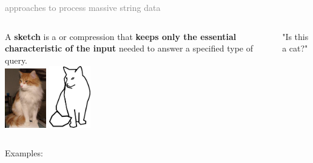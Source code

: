 \begin{frame}{\textcolor{gray}{ approaches to process massive string data}}
    \pause
    \begin{columns}
        A \textbf{sketch} is a  or  compression that \textbf{keeps only the essential characteristic of the input} needed to answer a specified type of query.\\
        \includegraphics[width=1.8cm]{pictures/photo_betisou.jpg}
        \hspace{0.5cm}
        \includegraphics[width=1.8cm]{pictures/betisou.png}\\
        \begin{center}
            "Is this a cat?"
        \end{center}
    \end{columns}
    \pause

    {\Large Examples:}
    \medskip
    \begin{columns}
        {}
        {}
    \end{columns}
    
\end{frame}

